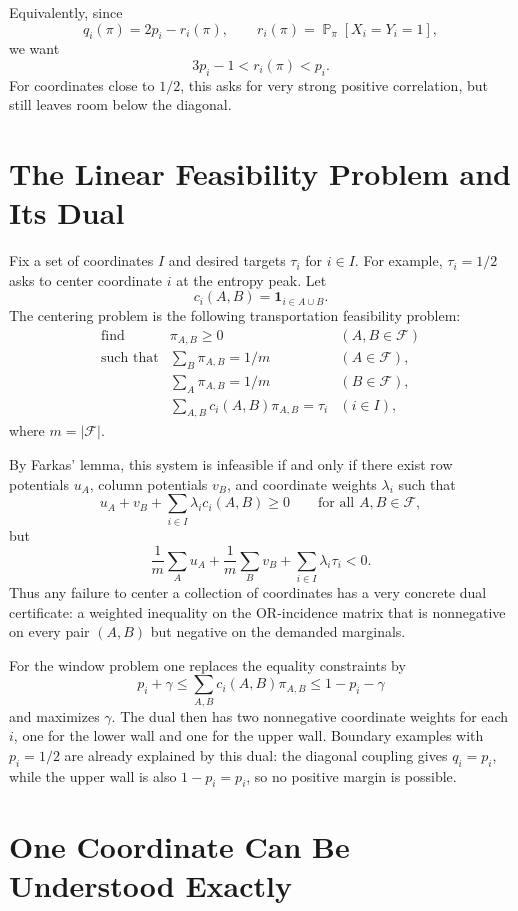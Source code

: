 \documentclass[11pt]{article}
\DeclareMathOperator{\Prb}{\mathbb{P}}
\begin{document}
Equivalently, since
\[
  q_i(\pi)=2p_i-r_i(\pi),
  \qquad
  r_i(\pi)=\Prb_\pi[X_i=Y_i=1],
\]
we want
\[
  3p_i-1 < r_i(\pi) < p_i.
\]
For coordinates close to $1/2$, this asks for very strong positive
correlation, but still leaves room below the diagonal.

\section{The Linear Feasibility Problem and Its Dual}

Fix a set of coordinates $I$ and desired targets $\tau_i$ for $i\in I$.
For example, $\tau_i=1/2$ asks to center coordinate $i$ at the entropy peak.
Let
\[
  c_i(A,B)=\mathbf{1}_{i\in A\cup B}.
\]
The centering problem is the following transportation feasibility problem:
\[
\begin{array}{rll}
  \text{find} & \pi_{A,B}\ge 0 & (A,B\in\mathcal{F})\\[2mm]
  \text{such that}
    & \displaystyle \sum_B \pi_{A,B}=1/m & (A\in\mathcal{F}),\\[3mm]
    & \displaystyle \sum_A \pi_{A,B}=1/m & (B\in\mathcal{F}),\\[3mm]
    & \displaystyle \sum_{A,B} c_i(A,B)\pi_{A,B}=\tau_i
      & (i\in I),
\end{array}
\]
where $m=|\mathcal{F}|$.

By Farkas' lemma, this system is infeasible if and only if there exist row
potentials $u_A$, column potentials $v_B$, and coordinate weights $\lambda_i$
such that
\[
  u_A+v_B+\sum_{i\in I}\lambda_i c_i(A,B)\ge 0
  \qquad\text{for all }A,B\in\mathcal{F},
\]
but
\[
  \frac1m\sum_A u_A+\frac1m\sum_B v_B+\sum_{i\in I}\lambda_i\tau_i<0.
\]
Thus any failure to center a collection of coordinates has a very concrete
dual certificate: a weighted inequality on the OR-incidence matrix that is
nonnegative on every pair $(A,B)$ but negative on the demanded marginals.

For the window problem one replaces the equality constraints by
\[
  p_i+\gamma \leq \sum_{A,B}c_i(A,B)\pi_{A,B}
  \leq 1-p_i-\gamma
\]
and maximizes $\gamma$.  The dual then has two nonnegative coordinate weights
for each $i$, one for the lower wall and one for the upper wall.  Boundary
examples with $p_i=1/2$ are already explained by this dual: the diagonal
coupling gives $q_i=p_i$, while the upper wall is also $1-p_i=p_i$, so no
positive margin is possible.

\section{One Coordinate Can Be Understood Exactly}
\end{document}
